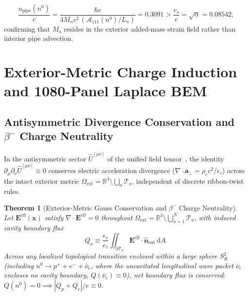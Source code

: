 \documentclass[11pt, a4paper]{article}
\newtheorem{theorem}{Theorem}[section]
\DeclareRobustCommand{\dd}{\mathrm{d}}
\begin{document}
\begin{enumerate}[leftmargin=1.8em, itemsep=2pt]
    \begin{equation}
        \frac{u_{\mathrm{pipe}}(n^0)}{c} = \frac{\hbar c}{4 M_n c^2\,(\mathcal{A}_{111}(n^0)/L_n)} = \mathbf{0.3091} > \frac{v_s}{c} = \sqrt{\alpha} = \mathbf{0.08542},
        \label{eq:cavitation_speed_bound}
    \end{equation}
    confirming that $M_a$ resides in the exterior added-mass strain field rather than interior pipe advection.
\end{enumerate}

\section{Exterior-Metric Charge Induction and 1080-Panel Laplace BEM}
\label{sec:charge_quantization}

\subsection{\texorpdfstring{Antisymmetric Divergence Conservation and $\beta^-$ Charge Neutrality}{Antisymmetric Divergence Conservation and Beta-Decay Charge Neutrality}}
In the antisymmetric sector $\hat{U}^{[\mu\nu]}$ of the unified field tensor~\cite{bairmosheh2026,bairmosheh2026b}, the identity $\partial_\mu\partial_\nu \hat{U}^{[\mu\nu]} \equiv 0$ conserves electric acceleration divergence ($\nabla\cdot\mathbf{a}_\perp = \rho_e c^2/\epsilon_\tau$) across the intact exterior metric $\Omega_{\mathrm{ext}} = \mathbb{R}^3 \setminus \bigcup_a \mathcal{T}_a$, independent of discrete ribbon-twist rules.

\begin{theorem}[Exterior-Metric Gauss Conservation and $\beta^-$ Charge Neutrality]
\label{thm:hopf_charge}
Let $\mathbf{E}^{\mathrm{eff}}(\mathbf{x})$ satisfy $\nabla\cdot\mathbf{E}^{\mathrm{eff}} = 0$ throughout $\Omega_{\mathrm{ext}} = \mathbb{R}^3 \setminus \bigcup_{a=1}^N \mathcal{T}_a$, with induced cavity boundary flux
\begin{equation}
    Q_a \equiv \frac{\epsilon_\tau}{e_\tau}\iint_{\partial\mathcal{T}_a} \mathbf{E}^{\mathrm{eff}}\cdot\hat{\mathbf{n}}_{\mathrm{out}}\,\dd A.
    \label{eq:exterior_gauss_charge}
\end{equation}
Across any localized topological transition enclosed within a large sphere $S^2_R$ (including $n^0 \to p^+ + e^- + \bar{\nu}_e$, where the uncavitated longitudinal wave packet $\bar{\nu}_e$ encloses no cavity boundary, $Q(\bar{\nu}_e) \equiv 0$), net boundary flux is conserved: $Q(n^0) = 0 \implies |Q_p + Q_e|/e \equiv 0$.
\end{theorem}
\end{document}
